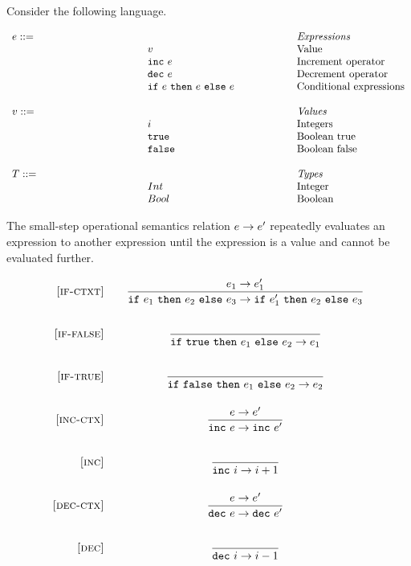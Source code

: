 \documentclass[addpoints]{exam}
\makeatletter
\newcommand{\mydefhead}[2]{\multicolumn{2}{l}{{#1}}&\mbox{\emph{#2}}\\}
\newcommand{\mydefcase}[2]{\qquad\qquad\qquad\qquad\qquad\qquad& #1 &\mbox{#2}\\}
\newcommand{\rel}[1]{ \mbox{\sc [#1]} }
\newcommand{\sstep}[2]{{#1} \rightarrow {#2}}
\newcommand{\ssrule}[3]{
  \rel{#1} &
  \frac{\strut\begin{array}{@{}c@{}} #2 \end{array}}
       {\strut\begin{array}{@{}c@{}} #3 \end{array}}
   \\~\\
}
\makeatother
\begin{document}
\begin{questions}

  \question[15]
  Consider the following language.

\newcommand{\incexp}[1]{\mbox{\tt inc}~{#1}}
\newcommand{\decexp}[1]{\mbox{\tt dec}~{#1}}
\newcommand{\ifexp}[3]{\mbox{\tt if}~{#1}~{\tt then}~{#2}~{\tt else}~{#3}}
\newcommand{\ttrue}{\mbox{\tt true}}
\newcommand{\ffalse}{\mbox{\tt false}}

\[
  \begin{array}{ll@{\qquad\qquad\qquad}l}
  \mydefhead{e ::=}{Expressions}
    \mydefcase{v}{Value}
    \mydefcase{\incexp{e}}{Increment operator}
    \mydefcase{\decexp{e}}{Decrement operator}
    \mydefcase{\ifexp{e}{e}{e}}{Conditional expressions}
  \\
    \mydefhead{v ::=\qquad\qquad\qquad\qquad}{Values}
    \mydefcase{i}{Integers}
    \mydefcase{\ttrue}{Boolean true}
    \mydefcase{\ffalse}{Boolean false}
  \\
    \mydefhead{T ::=\qquad\qquad\qquad\qquad}{Types}
    \mydefcase{Int}{Integer}
    \mydefcase{Bool}{Boolean}
\end{array}
\]

The small-step operational semantics relation
$\large \sstep{e}{e'} $
  repeatedly evaluates an expression to another expression
until the expression is a value and cannot be evaluated further.

\[
  \begin{array}{r@{\qquad}c}

    \ssrule{if-ctxt}{
      \sstep{e_1}{e_1'} \\
    }{
      \sstep{\ifexp{e_1}{e_2}{e_3}}{\ifexp{e_1'}{e_2}{e_3}}
    }

    \ssrule{if-false}{
    }{
      \sstep{\ifexp{\ttrue}{e_1}{e_2}}{e_1}
    }

    \ssrule{if-true}{
    }{
      \sstep{\ifexp{\ffalse}{e_1}{e_2}}{e_2}
    }

    \ssrule{inc-ctx}{
      \sstep{e}{e'} \\
    }{
      \sstep{\incexp{e}}{\incexp{e'}}
    }

    \ssrule{inc}{
    }{
      \sstep{\incexp{i}}{i+1}
    }

    \ssrule{dec-ctx}{
      \sstep{e}{e'} \\
    }{
      \sstep{\decexp{e}}{\decexp{e'}}
    }

    \ssrule{dec}{
    }{
      \sstep{\decexp{i}}{i-1}
    }


\end{array}\]
\end{questions}
\end{document}
